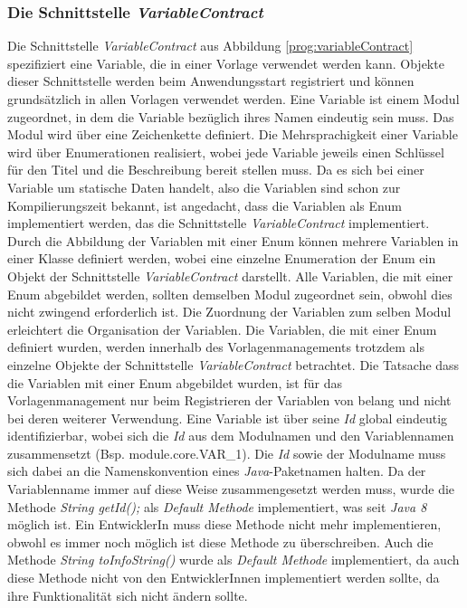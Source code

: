 \subsubsection{Die Schnittstelle \emph{VariableContract}}
\label{sec:variableContract}
Die Schnittstelle \emph{VariableContract} aus Abbildung \ref{prog:variableContract} spezifiziert eine Variable, die in einer Vorlage verwendet werden kann. Objekte dieser Schnittstelle werden beim Anwendungsstart registriert und können grundsätzlich in allen Vorlagen verwendet werden. Eine Variable ist einem Modul zugeordnet, in dem die Variable bezüglich ihres Namen eindeutig sein muss. Das Modul wird über eine Zeichenkette definiert. Die Mehrsprachigkeit einer Variable wird über Enumerationen realisiert, wobei jede Variable jeweils einen Schlüssel für den Titel und die Beschreibung bereit stellen muss.
\newline
\newline
Da es sich bei einer Variable um statische Daten handelt, also die Variablen sind schon zur Kompilierungszeit bekannt, ist angedacht, dass die Variablen als Enum implementiert werden, das die Schnittstelle \emph{VariableContract} implementiert. Durch die Abbildung der Variablen mit einer Enum können mehrere Variablen in einer Klasse definiert werden, wobei eine einzelne Enumeration der Enum ein Objekt der Schnittstelle \emph{VariableContract} darstellt. Alle Variablen, die mit einer Enum abgebildet werden, sollten demselben Modul zugeordnet sein, obwohl dies nicht zwingend erforderlich ist. Die Zuordnung der Variablen zum selben Modul erleichtert die Organisation der Variablen. Die Variablen, die mit einer Enum definiert wurden, werden innerhalb des Vorlagenmanagements trotzdem als einzelne Objekte der Schnittstelle \emph{VariableContract} betrachtet. Die Tatsache dass die Variablen mit einer Enum abgebildet wurden, ist für das Vorlagenmanagement nur beim Registrieren der Variablen von belang und nicht bei deren weiterer Verwendung.
\newline
\newline
Eine Variable ist über seine \emph{Id} global eindeutig identifizierbar, wobei sich die \emph{Id} aus dem Modulnamen und den Variablennamen zusammensetzt (Bsp. module.core.VAR\_1). Die \emph{Id} sowie der Modulname muss sich dabei an die Namenskonvention eines \emph{Java}-Paketnamen halten. Da der Variablenname immer auf diese Weise zusammengesetzt werden muss, wurde die Methode \emph{String getId();} als \emph{Default Methode} implementiert, was seit \emph{Java 8} möglich ist. Ein EntwicklerIn muss diese Methode nicht mehr implementieren, obwohl es immer noch möglich ist diese Methode zu überschreiben. Auch die Methode \emph{String toInfoString()} wurde als \emph{Default Methode} implementiert, da auch diese Methode nicht von den EntwicklerInnen implementiert werden sollte, da ihre Funktionalität sich nicht ändern sollte.
\newpage

